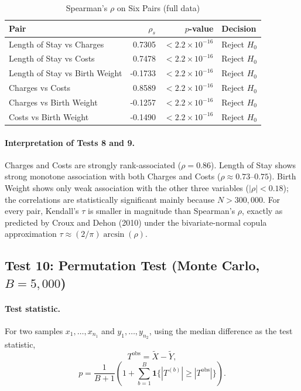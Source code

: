 \documentclass[12pt]{article}
\begin{document}
\begin{table}[H]
\centering
\caption{Spearman's $\rho$ on Six Pairs (full data)}
\label{tab:spearman}
\begin{tabular}{l r r l}
\toprule
\textbf{Pair} & \textbf{$\rho_s$} & \textbf{$p$-value} & \textbf{Decision} \\
\midrule
Length of Stay vs Charges     &  0.7305 & $< 2.2\times 10^{-16}$ & Reject $H_0$ \\
Length of Stay vs Costs       &  0.7478 & $< 2.2\times 10^{-16}$ & Reject $H_0$ \\
Length of Stay vs Birth Weight     & -0.1733 & $< 2.2\times 10^{-16}$ & Reject $H_0$ \\
Charges vs Costs   &  0.8589 & $< 2.2\times 10^{-16}$ & Reject $H_0$ \\
Charges vs Birth Weight & -0.1257 & $< 2.2\times 10^{-16}$ & Reject $H_0$ \\
Costs vs Birth Weight   & -0.1490 & $< 2.2\times 10^{-16}$ & Reject $H_0$ \\
\bottomrule
\end{tabular}
\end{table}

\paragraph{Interpretation of Tests 8 and 9.} Charges and Costs are
strongly rank-associated ($\rho=0.86$). Length of Stay shows strong monotone
association with both Charges and Costs ($\rho\approx 0.73$--$0.75$).
Birth Weight shows only weak association with the other three
variables ($|\rho|<0.18$); the correlations are statistically
significant mainly because $N>300{,}000$. For every pair, Kendall's
$\tau$ is smaller in magnitude than Spearman's $\rho$, exactly as
predicted by Croux and Dehon (2010) under the bivariate-normal copula
approximation $\tau \approx (2/\pi)\arcsin(\rho)$.

\subsection{Test 10: Permutation Test (Monte Carlo, $B=5{,}000$)}

\paragraph{Test statistic.} For two samples $x_1,\dots,x_{n_1}$ and
$y_1,\dots,y_{n_2}$, using the median difference as the test
statistic,
\[
  T^{\text{obs}} = \tilde{X} - \tilde{Y},
\]
\[
  p = \frac{1}{B+1}\left(1 + \sum_{b=1}^{B}
    \mathbf{1}\bigl\{ |T^{(b)}| \ge |T^{\text{obs}}| \bigr\}\right).
\]
\end{document}
